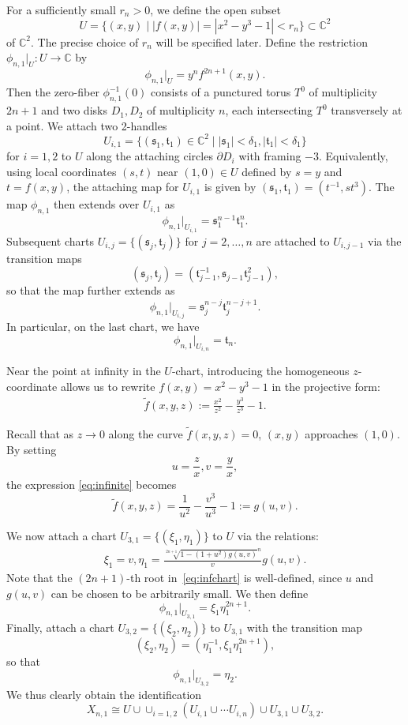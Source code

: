 \documentclass[10pt,a4paper,reqno]{amsart}
\theoremstyle{definition}
\numberwithin{equation}{section}
\numberwithin{figure}{section}
\newcommand{\C}{\mathbb{C}}
\newcommand{\arrowr}{\rightarrow}
\begin{document}
For a sufficiently small $r_n>0$, we define the open subset 
\[U=\{(x,y)\mid |f(x,y)|=|x^2-y^3-1|<r_n\}\subset \C^2\]
of $\C^2$.
The precise choice of $r_n$ will be specified later.
Define the restriction $\phi_{n,1}|_U: U \arrowr \C$ by 
\[\phi_{n,1}|_U=y^n f^{2n+1}(x,y).\]
Then the zero-fiber $\phi_{n,1}^{-1}(0)$ consists of a punctured torus $T^0$ of multiplicity $2n+1$ and two disks $D_1, D_2$ of multiplicity $n$, each intersecting $T^0$ transversely at a point.
We attach two 2-handles 
\[U_{i,1}=\{(\mathfrak{s}_1, \mathfrak{t}_1)\in \C^2 \mid |\mathfrak{s}_1|<\delta_1, |\mathfrak{t}_1|<\delta_1 \}\] 
for $i=1,2$ to $U$ along the attaching circles $\partial D_i$ with framing $-3$.
Equivalently, using local coordinates $(s,t)$ near $(1,0)\in U$ defined by $s=y$ and $t=f(x,y)$, 
the attaching map for $U_{i,1}$ is given by $(\mathfrak{s}_1,\mathfrak{t}_1)=(t^{-1}, st^3)$.
The map $\phi_{n,1}$ then extends over $U_{i,1}$ as 
\[\phi_{n,1}|_{U_{i,1}}=\mathfrak{s}_1^{n-1}\mathfrak{t}_1^n.\]
Subsequent charts $U_{i,j}=\{(\mathfrak{s}_j, \mathfrak{t}_j) \}$ for $j=2,\dots, n$ are attached to $U_{i,j-1}$ via the transition maps 
\[(\mathfrak{s}_j, \mathfrak{t}_j)=(\mathfrak{t}_{j-1}^{-1}, \mathfrak{s}_{j-1}\mathfrak{t}_{j-1}^2),\] 
so that the map further extends as \[\phi_{n,1}|_{U_{i,j}}=\mathfrak{s}_j^{n-j}\mathfrak{t}_j^{n-j+1}.\]
In particular, on the last chart, we have \[\phi_{n,1}|_{U_{i,n}}=\mathfrak{t}_n.\]

Near the point at infinity in the $U$-chart, introducing the homogeneous $z$-coordinate allows us to rewrite $f(x,y)=x^2 -y^3 -1$ in the projective form:
\begin{align}\label{eq:infinite}
\tilde{f}(x,y,z):=\frac{x^2}{z^2}-\frac{y^3}{z^3}-1.
\end{align}

Recall that as $z\arrowr 0$ along the curve $\tilde{f}(x,y,z)=0$, $(x,y)$ approaches $(1,0)$.
By setting \[u=\frac{z}{x}, v=\frac{y}{x},\] the expression \eqref{eq:infinite} becomes 
\[\tilde{f}(x,y,z)=\frac{1}{u^{2}}-\frac{v^3}{u^3}-1:=g(u,v).\]

We now attach a chart $U_{3,1}=\{(\xi_1, \eta_1)\}$ to $U$ via the relations: 
\begin{align} \label{eq:infchart}
\xi_1=v, \eta_1=\frac{\sqrt[2n+1]{1-(1+u^2)g(u,v)}^n}{v} g(u,v).
\end{align}
Note that the $(2n+1)$-th root in~\eqref{eq:infchart} is well-defined, since $u$ and $g(u,v)$ can be chosen to be arbitrarily small.
We then define \[\phi_{n,1}|_{U_{3,1}}=\xi_1 \eta_1^{2n+1}.\]
Finally, attach a chart $U_{3,2}=\{(\xi_2, \eta_2)\}$ to $U_{3,1}$ with the transition map 
\[(\xi_2, \eta_2)=(\eta_1^{-1}, \xi_1 \eta_1^{2n+1}),\] so that 
\[\phi_{n,1}|_{U_{3,2}}=\eta_2.\]
We thus clearly obtain the identification 
\[X_{n,1} \cong U\cup \cup_{i=1,2}(U_{i,1}\cup \cdots U_{i,n}) \cup U_{3,1} \cup U_{3,2}.\]
\end{document}
